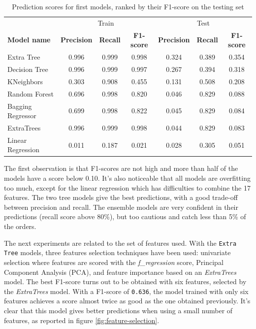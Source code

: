 \begin{table}[htb]
    \begin{tabular}{l|ccc|ccc}
                          & \multicolumn{3}{c|}{Train}                         & \multicolumn{3}{c}{Test}      \\
        \textbf{Model name}        & \textbf{Precision} & \textbf{Recall} & \textbf{F1-score} & \textbf{Precision} & \textbf{Recall} & \textbf{F1-score} \\ \hline
        Extra Tree        & 0.996     & 0.999  & 0.998                         & 0.324     & 0.389  & 0.354    \\
        Decision Tree     & 0.996     & 0.999  & 0.997                         & 0.267     & 0.394  & 0.318   \\
        KNeighbors        & 0.303     & 0.908  & 0.455                         & 0.131     & 0.508  & 0.208    \\
        Random Forest     & 0.696     & 0.998  & 0.820                         & 0.046     & 0.829  & 0.088    \\
        Bagging Regressor & 0.699     & 0.998  & 0.822                         & 0.045     & 0.829  & 0.084    \\
        ExtraTrees        & 0.996     & 0.999  & 0.998                         & 0.044     & 0.829  & 0.083    \\
        Linear Regression & 0.011     & 0.187  & 0.021                         & 0.028     & 0.305  & 0.051    
    \end{tabular}
    \caption[Prediction scores for first models]{Prediction scores for first models, ranked by their F1-score on the testing set}
    \label{tab:scores-simple-models}
\end{table}

The first observation is that F1-scores are not high and more than half of the models have a score below 0.10. It's also noticeable that all models are overfitting too much, except for the linear regression which has difficulties to combine the 17 features. The two tree models give the best predictions, with a good trade-off between precision and recall. The ensemble models are very confident in their predictions (recall score above 80\%), but too cautious and catch less than 5\% of the orders.

The next experiments are related to the set of features used. With the \texttt{Extra Tree} models, three features selection techniques have been used: univariate selection where features are scored with the \textit{f\_regression} score, Principal Component Analysis (PCA), and feature importance based on an \textit{ExtraTrees} model. The best F1-score turns out to be obtained with six features, selected by the \textit{ExtraTrees} model. With a F1-score of \texttt{0.636}, the model trained with only six features achieves a score almost twice as good as the one obtained previously. It's clear that this model gives better predictions when using a small number of features, as reported in figure \ref{fig:feature-selection}.

